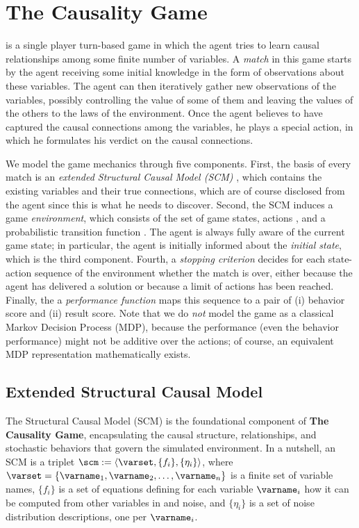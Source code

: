 \documentclass{article}
\begin{document}
\section{The Causality Game}
    \game is a single player turn-based game in which the agent tries to learn causal relationships among some finite number of variables.
    A \emph{match} in this game starts by the agent receiving some initial knowledge in the form of observations about these variables.
    The agent can then iteratively gather new observations of the variables, possibly controlling the value of some of them and  leaving the values of the others to the laws of the environment.
    Once the agent believes to have captured the causal connections among the variables, he plays a special action, in which he formulates his verdict on the causal connections.

    We model the game mechanics through five components.
    First, the basis of every match is an \emph{extended Structural Causal Model (SCM)} \scm \citep{pearl}, which contains the existing variables and their true connections, which are of course disclosed from the agent since this is what he needs to discover.
    Second, the SCM induces a game \emph{environment}, which consists of the set \statespace of game states, actions \actionspace, and a probabilistic transition function \transition.
    The agent is always fully aware of the current game state; in particular, the agent is initially informed about the \emph{initial state}, which is the third component.
    Fourth, a \emph{stopping criterion} decides for each state-action sequence of the environment whether the match is over, either because the agent has delivered a solution or because a limit of actions has been reached.
    Finally, the a \emph{performance function} maps this sequence to a pair of (i) behavior score and (ii) result score.
    Note that we do \emph{not} model the game as a classical Markov Decision Process (MDP), because the performance (even the behavior performance) might not be additive over the actions; of course, an equivalent MDP representation mathematically exists.


    \subsection{Extended Structural Causal Model}
        The Structural Causal Model (SCM) \scm is the foundational component of \textbf{The Causality Game}, encapsulating the causal structure, relationships, and stochastic behaviors that govern the simulated environment.
        In a nutshell, an SCM is a triplet $\scm := \langle \varset, \{f_i\}, \{\eta_i\}\rangle$,
        where $ \varset = \{\varname_1, \varname_2, \ldots, \varname_n\} $ is a finite set of variable names, 
        $\{f_i\}$ is a set of equations defining for each variable $\varname_i$ how it can be computed from other variables in \varset and noise, and $\{\eta_i\}$ is a set of noise distribution descriptions, one per $\varname_i$.
        
\end{document}
